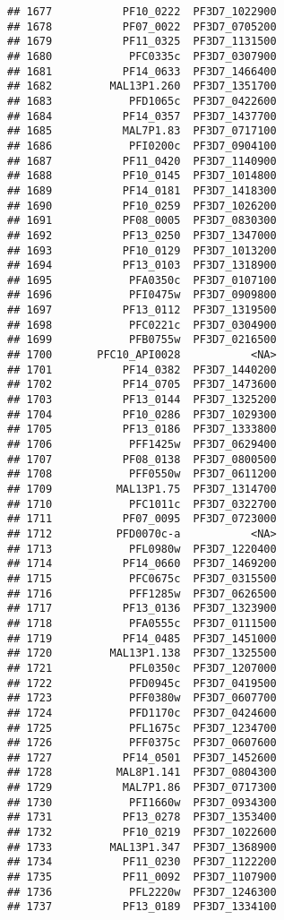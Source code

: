 \documentclass[12pt, a4paper]{article}\usepackage[]{graphicx}\usepackage[]{color}
\makeatletter
\newenvironment{kframe}{%
 \def\at@end@of@kframe{}%
 \ifinner\ifhmode%
  \def\at@end@of@kframe{\end{minipage}}%
  \begin{minipage}{\columnwidth}%
 \fi\fi%
 \def\FrameCommand##1{\hskip\@totalleftmargin \hskip-\fboxsep
 \colorbox{shadecolor}{##1}\hskip-\fboxsep
     \hskip-\linewidth \hskip-\@totalleftmargin \hskip\columnwidth}%
 \MakeFramed {\advance\hsize-\width
   \@totalleftmargin\z@ \linewidth\hsize
   \@setminipage}}%
 {\par\unskip\endMakeFramed%
 \at@end@of@kframe}
\newenvironment{knitrout}{}{} %
\makeatother
\begin{document}
\begin{knitrout}
\begin{kframe}
\begin{verbatim}
## 1677           PF10_0222  PF3D7_1022900
## 1678           PF07_0022  PF3D7_0705200
## 1679           PF11_0325  PF3D7_1131500
## 1680            PFC0335c  PF3D7_0307900
## 1681           PF14_0633  PF3D7_1466400
## 1682         MAL13P1.260  PF3D7_1351700
## 1683            PFD1065c  PF3D7_0422600
## 1684           PF14_0357  PF3D7_1437700
## 1685           MAL7P1.83  PF3D7_0717100
## 1686            PFI0200c  PF3D7_0904100
## 1687           PF11_0420  PF3D7_1140900
## 1688           PF10_0145  PF3D7_1014800
## 1689           PF14_0181  PF3D7_1418300
## 1690           PF10_0259  PF3D7_1026200
## 1691           PF08_0005  PF3D7_0830300
## 1692           PF13_0250  PF3D7_1347000
## 1693           PF10_0129  PF3D7_1013200
## 1694           PF13_0103  PF3D7_1318900
## 1695            PFA0350c  PF3D7_0107100
## 1696            PFI0475w  PF3D7_0909800
## 1697           PF13_0112  PF3D7_1319500
## 1698            PFC0221c  PF3D7_0304900
## 1699            PFB0755w  PF3D7_0216500
## 1700       PFC10_API0028           <NA>
## 1701           PF14_0382  PF3D7_1440200
## 1702           PF14_0705  PF3D7_1473600
## 1703           PF13_0144  PF3D7_1325200
## 1704           PF10_0286  PF3D7_1029300
## 1705           PF13_0186  PF3D7_1333800
## 1706            PFF1425w  PF3D7_0629400
## 1707           PF08_0138  PF3D7_0800500
## 1708            PFF0550w  PF3D7_0611200
## 1709          MAL13P1.75  PF3D7_1314700
## 1710            PFC1011c  PF3D7_0322700
## 1711           PF07_0095  PF3D7_0723000
## 1712          PFD0070c-a           <NA>
## 1713            PFL0980w  PF3D7_1220400
## 1714           PF14_0660  PF3D7_1469200
## 1715            PFC0675c  PF3D7_0315500
## 1716            PFF1285w  PF3D7_0626500
## 1717           PF13_0136  PF3D7_1323900
## 1718            PFA0555c  PF3D7_0111500
## 1719           PF14_0485  PF3D7_1451000
## 1720         MAL13P1.138  PF3D7_1325500
## 1721            PFL0350c  PF3D7_1207000
## 1722            PFD0945c  PF3D7_0419500
## 1723            PFF0380w  PF3D7_0607700
## 1724            PFD1170c  PF3D7_0424600
## 1725            PFL1675c  PF3D7_1234700
## 1726            PFF0375c  PF3D7_0607600
## 1727           PF14_0501  PF3D7_1452600
## 1728          MAL8P1.141  PF3D7_0804300
## 1729           MAL7P1.86  PF3D7_0717300
## 1730            PFI1660w  PF3D7_0934300
## 1731           PF13_0278  PF3D7_1353400
## 1732           PF10_0219  PF3D7_1022600
## 1733         MAL13P1.347  PF3D7_1368900
## 1734           PF11_0230  PF3D7_1122200
## 1735           PF11_0092  PF3D7_1107900
## 1736            PFL2220w  PF3D7_1246300
## 1737           PF13_0189  PF3D7_1334100

\end{verbatim}
\end{kframe}
\end{knitrout}
\end{document}
